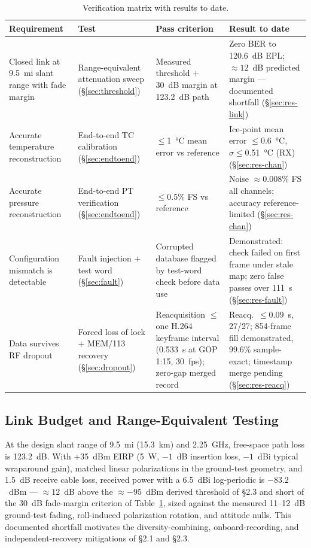 \documentclass[12pt,letterpaper]{article}
\begin{document}
\begin{table}[htbp]
  \centering
  \caption{Verification matrix with results to date.}
  \label{tab:matrix}
  \footnotesize
  \begin{tabular}{p{3.2cm}p{3.4cm}p{3.6cm}p{4.2cm}}
    \toprule
    Requirement & Test & Pass criterion & Result to date \\
    \midrule
    Closed link at 9.5~mi slant range with fade margin &
    Range-equivalent attenuation sweep (\S\ref{sec:threshold}) &
    Measured threshold + 30~dB margin at 123.2~dB path &
    Zero BER to 120.6~dB EPL; ${\approx}12$~dB predicted margin --- documented shortfall (\S\ref{sec:res-link}) \\
    Accurate temperature reconstruction &
    End-to-end TC calibration (\S\ref{sec:endtoend}) &
    $\le$1~\si{\celsius} mean error vs reference &
    Ice-point mean error $\le$0.6~\si{\celsius}, $\sigma \le$0.51~\si{\celsius} (RX) (\S\ref{sec:res-chan}) \\
    Accurate pressure reconstruction &
    End-to-end PT verification (\S\ref{sec:endtoend}) &
    $\le$0.5\% FS vs reference &
    Noise $\approx$0.008\% FS all channels; accuracy reference-limited (\S\ref{sec:res-chan}) \\
    Configuration mismatch is detectable &
    Fault injection + test word (\S\ref{sec:fault}) &
    Corrupted database flagged by test-word check before data use &
    Demonstrated: check failed on first frame under stale map; zero false passes over 111~s (\S\ref{sec:res-fault}) \\
    Data survives RF dropout &
    Forced loss of lock + MEM/113 recovery (\S\ref{sec:dropout}) &
    Reacquisition $\le$ one H.264 keyframe interval (0.533~s at GOP 1:15, 30~fps); zero-gap merged record &
    Reacq.\ ${\le}0.09$~s, 27/27; 854-frame fill demonstrated, 99.6\% sample-exact; timestamp merge pending (\S\ref{sec:res-reacq}) \\
    \bottomrule
  \end{tabular}
\end{table}

\subsection{Link Budget and Range-Equivalent Testing}\label{sec:linkbudget}

At the design slant range of 9.5~mi (15.3~km) and 2.25~GHz, free-space
path loss is 123.2~dB. With +35~dBm EIRP (5~W, $-1$~dB insertion loss,
$-1$~dBi typical wraparound gain), matched linear polarizations in the
ground-test geometry, and 1.5~dB receive cable loss, received power with
a 6.5~dBi log-periodic is $-83.2$~dBm --- ${\approx}12$~dB above the
${\approx}{-95}$~dBm derived threshold of \S2.3 and short of the 30~dB
fade-margin criterion of Table~\ref{tab:matrix}, sized against the
measured 11--12~dB ground-test fading, roll-induced polarization
rotation, and attitude nulls. This documented shortfall motivates the
diversity-combining, onboard-recording, and independent-recovery
mitigations of \S2.1 and \S2.3.
\end{document}
